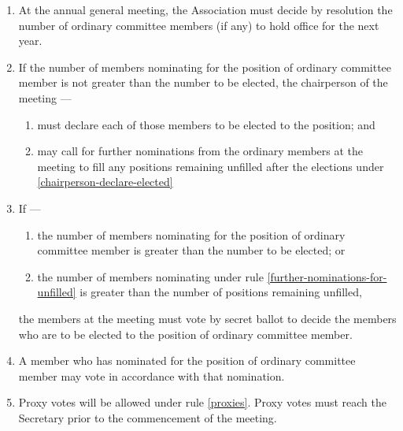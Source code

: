 \documentclass[../constitution.tex]{subfiles}
\begin{document}
\begin{enumerate}

\item At the annual general meeting, the Association must decide by resolution the number of ordinary committee members (if any) to hold office for the next year. 
\item If the number of members nominating for the position of ordinary committee member is not greater than the number to be elected, the chairperson of the meeting --- \label{nominating-committee-less-than-elected}

  \begin{enumerate}
  
  \item must declare each of those members to be elected to the position; and \label{chairperson-declare-elected}
  \item may call for further nominations from the ordinary members at the meeting to fill any positions remaining unfilled after the elections under  \ref{chairperson-declare-elected} \label{further-nominations-for-unfilled}
  \end{enumerate}
\item If ---

  \begin{enumerate}
  
  \item the number of members nominating for the position of ordinary committee member is greater than the number to be elected; or
  \item the number of members nominating under rule \ref{further-nominations-for-unfilled} is greater than the number of positions remaining unfilled,
  \end{enumerate}

  the members at the meeting must vote by secret ballot to decide the members who are to be elected to the position of ordinary committee member. 

\item A member who has nominated for the position of ordinary committee member may vote in accordance with that nomination.
\item Proxy votes will be allowed under rule \ref{proxies}. Proxy votes must reach the Secretary prior to the commencement of the meeting. 
\end{enumerate}
\end{document}
